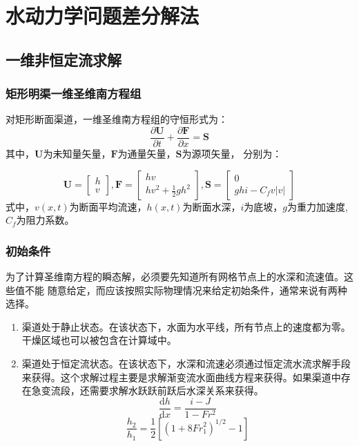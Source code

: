 \chapter{水动力学问题差分解法}
\section{一维非恒定流求解}
\subsection{矩形明渠一维圣维南方程组}
对矩形断面渠道，一维圣维南方程组的守恒形式为：
\begin{equation}
  \frac{\partial \mathbf{U}}{\partial t} +
  \frac{\partial \mathbf{F}}{\partial x} =
  \mathbf{S}
\end{equation}
其中，$\mathbf{U}$为未知量矢量，$\mathbf{F}$为通量矢量，$\mathbf{S}$为源项矢量，
分别为：

\begin{equation}
  \mathbf{U} = 
  \begin{bmatrix}
    h \\
    v
  \end{bmatrix}
  ,
  \mathbf{F} = 
  \begin{bmatrix}
    hv \\
    hv^{2} + \frac{1}{2}gh^{2}
  \end{bmatrix}
  ,
  \mathbf{S} = 
  \begin{bmatrix}
    0 \\
    ghi - C_{f}v|v|
  \end{bmatrix}
\end{equation}
式中，$v(x,t)$为断面平均流速，$h(x,t)$为断面水深，$i$为底坡，$g$为重力加速度,
$C_{f}$为阻力系数。

\subsection{初始条件}
为了计算圣维南方程的瞬态解，必须要先知道所有网格节点上的水深和流速值。这些值不能
随意给定，而应该按照实际物理情况来给定初始条件，通常来说有两种选择。
\begin{enumerate}
  \item 渠道处于静止状态。在该状态下，水面为水平线，所有节点上的速度都为零。干燥区域也可以被包含在计算域中。
  \item 渠道处于恒定流状态。在该状态下，水深和流速必须通过恒定流水流求解手段来获得。这个求解过程主要是求解渐变流水面曲线方程来获得。如果渠道中存在急变流段，还需要求解水跃跃前跃后水深关系来获得。
    \begin{equation}
    \frac{\mathrm{d}h}{\mathrm{d}x}
    =
    \frac{i - J }{1 - Fr^{2 }}
    \end{equation}
    \begin{equation}
      \frac{h_{2 }}{h_{1 }}
      =
      \frac{1}{2 }
      [(1+8{Fr}_{1}^{2})^{1/2} - 1]
    \end{equation}
\end{enumerate}


